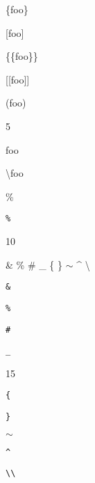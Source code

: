 
\def\mytitle{Special Characters}


\{foo\}

[foo]

\{\{foo\}\}

[[foo]]

(foo)

5

\textbar{}foo\textbar{}

\textbackslash{}foo

\%

\texttt{\%}

10

\& \% \# \_ \{ \} \ensuremath{\sim} \^{} \textbackslash{}

\texttt{\&}

\texttt{\%}

\texttt{\#}

\texttt{\_}

15

\texttt{\{}

\texttt{\}}

\texttt{\ensuremath{\sim}}

\texttt{\^{}}

\texttt{\textbackslash{}\textbackslash{}}




